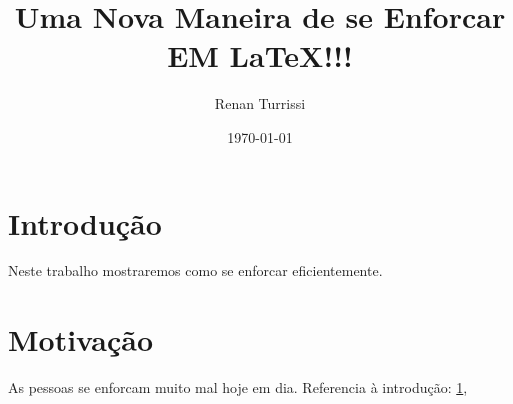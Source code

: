 \documentclass{article}
\author{Renan Turrissi}
\date{\today}
\title{Uma Nova Maneira de se Enforcar EM \LaTeX !!!}
\begin{document}
\maketitle

\newpage

\section{Introdução}\label{sec:intro}
Neste trabalho mostraremos como se enforcar eficientemente.

\section{Motivação}\label{sec:motiv}
As pessoas se enforcam muito mal hoje em dia.
Referencia à introdução: \ref{sec:intro},
\end{document}
